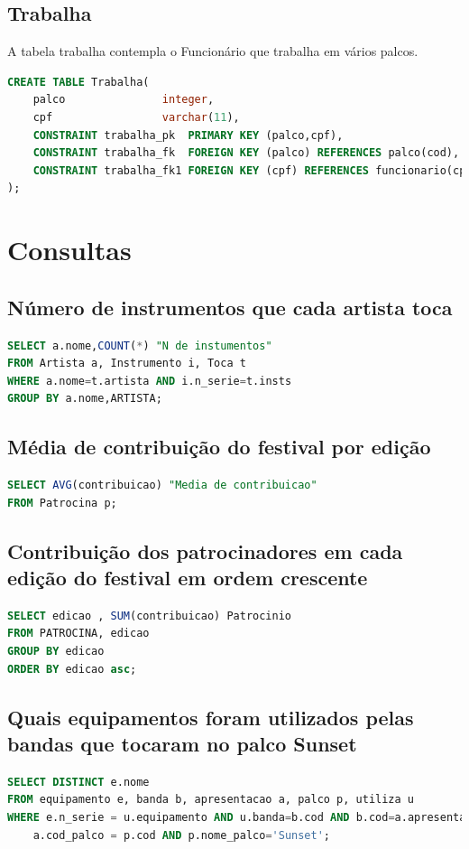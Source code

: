 \documentclass[12pt]{article}
\begin{document}
\subsection{Trabalha}
A tabela trabalha contempla o Funcionário que trabalha em vários palcos.
\begin{lstlisting}[language=sql]
CREATE TABLE Trabalha(
	palco				integer,
	cpf 				varchar(11),
	CONSTRAINT trabalha_pk 	PRIMARY KEY (palco,cpf),
	CONSTRAINT trabalha_fk 	FOREIGN KEY (palco) REFERENCES palco(cod),
	CONSTRAINT trabalha_fk1	FOREIGN KEY (cpf) REFERENCES funcionario(cpf)
);

\end{lstlisting}
\section{Consultas}
\subsection{Número de instrumentos que cada artista toca}
\begin{lstlisting}[language=sql]
SELECT a.nome,COUNT(*) "N de instumentos"
FROM Artista a, Instrumento i, Toca t
WHERE a.nome=t.artista AND i.n_serie=t.insts
GROUP BY a.nome,ARTISTA;
\end{lstlisting}
\subsection{Média de contribuição do festival por edição}
\begin{lstlisting}[language=sql]
SELECT AVG(contribuicao) "Media de contribuicao"
FROM Patrocina p;
\end{lstlisting}

\subsection{Contribuição dos patrocinadores em cada edição do festival em ordem crescente}
\begin{lstlisting}[language=sql]
SELECT edicao , SUM(contribuicao) Patrocinio
FROM PATROCINA, edicao
GROUP BY edicao
ORDER BY edicao asc;

\end{lstlisting}

\subsection{Quais equipamentos foram utilizados pelas bandas que tocaram no palco Sunset}
\begin{lstlisting}[language=sql]
SELECT DISTINCT e.nome
FROM equipamento e, banda b, apresentacao a, palco p, utiliza u
WHERE e.n_serie = u.equipamento AND u.banda=b.cod AND b.cod=a.apresentador AND 
	a.cod_palco = p.cod AND p.nome_palco='Sunset';
\end{lstlisting}
\end{document}
